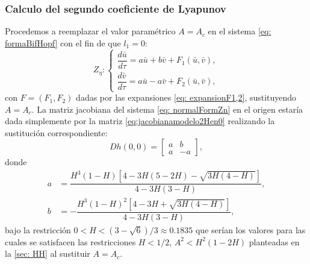 \subsubsection{Calculo del segundo coeficiente de Lyapunov}
Procedemos a reemplazar el valor paramétrico $A=A_c$ en el sistema \eqref{eq: formaBifHopf} con el fin de que $l_1 = 0$:
\begin{equation}
	Z_{\eta}:
	\begin{cases}
		\dfrac{d\bar{u}}{d \tau} = a\bar{u} + b\bar{v} + F_1(\bar{u}, \bar{v}),\\
		\dfrac{d\bar{v}}{d \tau} = a\bar{u} - a\bar{v} + F_2(\bar{u}, \bar{v}),
	\end{cases}
	\label{eq: normalFormZn}
\end{equation}
con $F=(F_{1}, F_2)$ dadas por las expansiones \eqref{eq: expansionF1,2}, sustituyendo $A=A_c$. La matriz jacobiana del sistema \eqref{eq: normalFormZn} en el origen estaría dada simplemente por la matriz \eqref{eq:jacobianamodelo2Hen0} realizando la sustitución correspondiente:
\begin{equation}
	Dh(0,0) =
	\begin{bmatrix}
		a & b \\
		a & - a
	\end{bmatrix},
\end{equation}
donde
\begin{equation*}
	\begin{aligned}
		a &= \dfrac{H^3(1 - H)[4 - 3H(5 - 2H) - \sqrt{3H(4 - H)}]}{4 - 3H(3 - H)}, \\
		b &= -\dfrac{H^3(1 - H)^2[4 - 3H + \sqrt{3H(4 - H)}]}{4 - 3H(3 - H)},
	\end{aligned}
\end{equation*}
bajo la restricción $0 < H < (3 - \sqrt{6})/3 \approx 0.1835$ que serían los valores para las cuales se satisfacen las restricciones $H<1/2$, $A^2 < H^2(1-2H)$ planteadas en la \autoref{sec: HH} al sustituir $A = A_c$.

